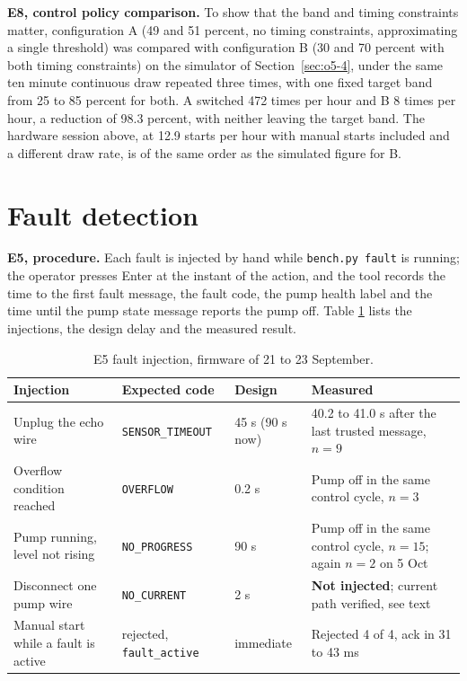 \textbf{E8, control policy comparison.} To show that the band and timing constraints matter, configuration A (49 and 51 percent, no timing constraints, approximating a single threshold) was compared with configuration B (30 and 70 percent with both timing constraints) on the simulator of Section~\ref{sec:o5-4}, under the same ten minute continuous draw repeated three times, with one fixed target band from 25 to 85 percent for both. A switched 472 times per hour and B 8 times per hour, a reduction of 98.3 percent, with neither leaving the target band. The hardware session above, at 12.9 starts per hour with manual starts included and a different draw rate, is of the same order as the simulated figure for B.

\section{Fault detection}
\label{sec:o8-4}

\textbf{E5, procedure.} Each fault is injected by hand while \texttt{bench.py fault} is running; the operator presses Enter at the instant of the action, and the tool records the time to the first fault message, the fault code, the pump health label and the time until the pump state message reports the pump off. Table \ref{tab:e5} lists the injections, the design delay and the measured result.

\begin{table}[H]
\caption{E5 fault injection, firmware of 21 to 23 September.}
\label{tab:e5}
\centering
\renewcommand{\arraystretch}{1.05}
\begin{tabular}{|p{4.4cm}|p{3.2cm}|p{2.0cm}|p{3.4cm}|}
\hline
\textbf{Injection} & \textbf{Expected code} & \textbf{Design} & \textbf{Measured} \\
\hline
Unplug the echo wire & \texttt{SENSOR\_TIMEOUT} & 45 s (90 s now) & 40.2 to 41.0 s after the last trusted message, $n = 9$ \\ \hline
Overflow condition reached & \texttt{OVERFLOW} & 0.2 s & Pump off in the same control cycle, $n = 3$ \\ \hline
Pump running, level not rising & \texttt{NO\_PROGRESS} & 90 s & Pump off in the same control cycle, $n = 15$; again $n = 2$ on 5 Oct \\ \hline
Disconnect one pump wire & \texttt{NO\_CURRENT} & 2 s & \textbf{Not injected}; current path verified, see text \\ \hline
Manual start while a fault is active & rejected, \texttt{fault\_active} & immediate & Rejected 4 of 4, ack in 31 to 43 ms \\ \hline
\end{tabular}
\end{table}

